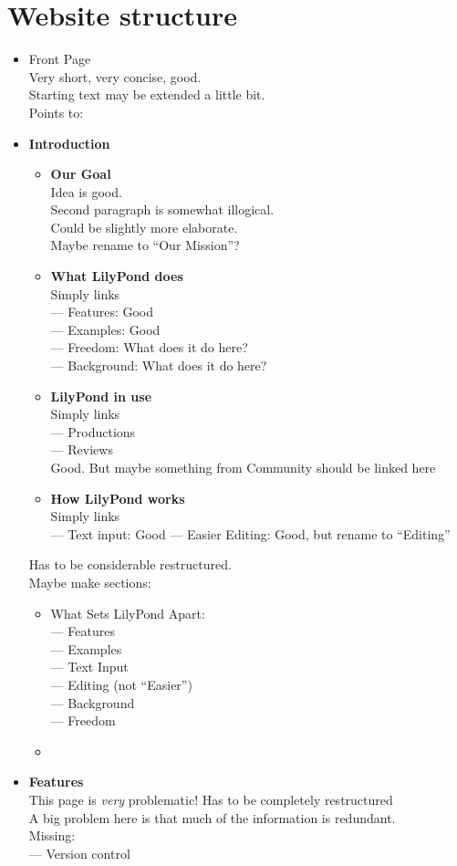 \documentclass[10pt,a4paper,]{article}
\begin{document}
\section*{Website structure}

\begin{itemize}
\item Front Page\\
Very short, very concise, good.\\
Starting text may be extended a little bit.\\
Points to:
\item \textbf{Introduction}
	\begin{itemize}
	\item \textbf{Our Goal}\\
		Idea is good.\\
		Second paragraph is somewhat illogical.\\
		Could be slightly more elaborate.\\
		Maybe rename to “Our Mission”?
	\item\textbf{ What LilyPond does}\\
		Simply links\\
		--- Features: Good\\
		--- Examples: Good\\
		--- Freedom: What does it do here?\\
		--- Background: What does it do here?
	\item \textbf{LilyPond in use}\\
		Simply links\\
		--- Productions\\
		--- Reviews\\
		Good. But maybe something from Community should be linked here
	\item \textbf{How LilyPond works}\\
		Simply links\\
		--- Text input: Good
		--- Easier Editing: Good, but rename to “Editing”
	\end{itemize}
	Has to be considerable restructured.\\
	Maybe make sections:\\
	\begin{itemize}
	\item What Sets LilyPond Apart:\\
	--- Features\\
	--- Examples\\
	--- Text Input\\
	--- Editing (not “Easier”)\\
	--- Background\\
	--- Freedom
	\item 
	\end{itemize}
\item \textbf{Features}\\
This page is \emph{very} problematic! Has to be completely restructured\\
A big problem here is that much of the information is redundant.\\
Missing:\\
--- Version control
\end{itemize}
\end{document}
